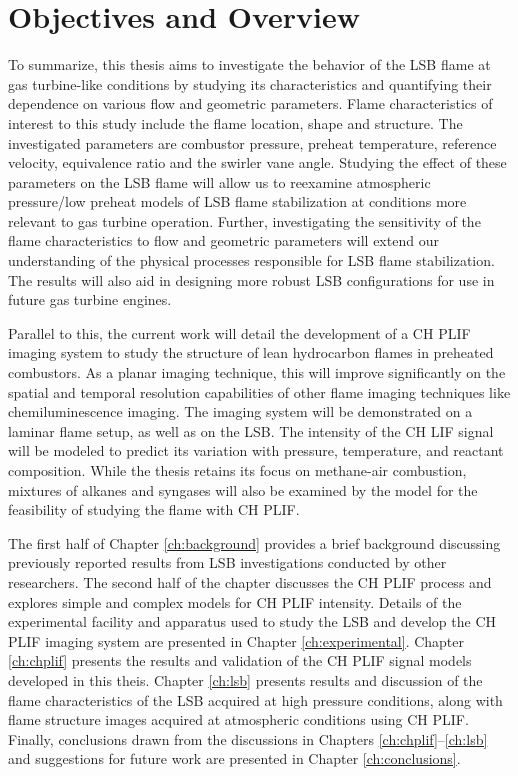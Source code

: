 \section{Objectives and Overview}

To summarize, this thesis aims to investigate the behavior of the LSB flame at gas turbine-like conditions by studying its characteristics and quantifying their dependence on various flow and geometric parameters.
Flame characteristics of interest to this study include the flame location, shape and structure.
The investigated parameters are combustor pressure, preheat temperature, reference velocity, equivalence ratio and the swirler vane angle.
Studying the effect of these parameters on the LSB flame will allow us to reexamine atmospheric pressure/low preheat models of LSB flame stabilization at conditions more relevant to gas turbine operation.
Further, investigating the sensitivity of the flame characteristics to flow and geometric parameters will extend our understanding of the physical processes responsible for LSB flame stabilization.
The results will also aid in designing more robust LSB configurations for use in future gas turbine engines.

Parallel to this, the current work will detail the development of a CH PLIF imaging system to study the structure of lean hydrocarbon flames in preheated combustors.
As a planar imaging technique, this will improve significantly on the spatial and temporal resolution capabilities of other flame imaging techniques like chemiluminescence imaging.
The imaging system will be demonstrated on a laminar flame setup, as well as on the LSB.
The intensity of the CH LIF signal will be modeled to predict its variation with pressure, temperature, and reactant composition.
While the thesis retains its focus on methane-air combustion, mixtures of alkanes and syngases will also be examined by the model for the feasibility of studying the flame with CH PLIF.

The first half of Chapter \ref{ch:background} provides a brief background discussing previously reported results from LSB investigations conducted by other researchers.
The second half of the chapter discusses the CH PLIF process and explores simple and complex models for CH PLIF intensity.
Details of the experimental facility and apparatus used to study the LSB and develop the CH PLIF imaging system are presented in Chapter \ref{ch:experimental}.
Chapter \ref{ch:chplif} presents the results and validation of the CH PLIF signal models developed in this theis.
Chapter \ref{ch:lsb} presents results and discussion of the flame characteristics of the LSB acquired at high pressure conditions, along with flame structure images acquired at atmospheric conditions using CH PLIF.
Finally, conclusions drawn from the discussions in Chapters \ref{ch:chplif}--\ref{ch:lsb} and suggestions for future work are presented in Chapter \ref{ch:conclusions}.


